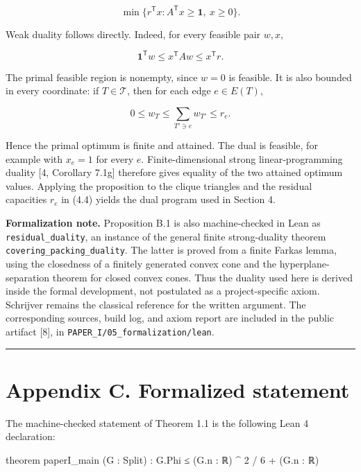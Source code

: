 \documentclass[
  11pt,
]{article}
\newenvironment{Shaded}{}{}
\newcommand{\NormalTok}[1]{#1}
\begin{document}
\[
\min\{r^{\mathsf T}x:A^{\mathsf T}x\ge\mathbf 1,\ x\ge0\}.
\]

Weak duality follows directly. Indeed, for every feasible pair \(w,x\),

\[
\mathbf 1^{\mathsf T}w
\le
x^{\mathsf T}Aw
\le
x^{\mathsf T}r.
\]

The primal feasible region is nonempty, since \(w=0\) is feasible. It is
also bounded in every coordinate: if \(T\in\mathcal T\), then for each
edge \(e\in E(T)\),

\[
0\le w_T\le\sum_{T'\ni e}w_{T'}\le r_e.
\]

Hence the primal optimum is finite and attained. The dual is feasible,
for example with \(x_e=1\) for every \(e\). Finite-dimensional strong
linear-programming duality {[}4, Corollary 7.1g{]} therefore gives
equality of the two attained optimum values. Applying the proposition to
the clique triangles and the residual capacities \(r_e\) in (4.4) yields
the dual program used in Section 4.

\textbf{Formalization note.} Proposition B.1 is also machine-checked in
Lean as \texttt{residual\_duality}, an instance of the general finite
strong-duality theorem \texttt{covering\_packing\_duality}. The latter
is proved from a finite Farkas lemma, using the closedness of a finitely
generated convex cone and the hyperplane-separation theorem for closed
convex cones. Thus the duality used here is derived inside the formal
development, not postulated as a project-specific axiom. Schrijver
remains the classical reference for the written argument. The
corresponding sources, build log, and axiom report are included in the
public artifact {[}8{]}, in \texttt{PAPER\_I/05\_formalization/lean}.

\begin{center}\rule{0.5\linewidth}{0.5pt}\end{center}

\section{Appendix C. Formalized
statement}\label{appendix-c.-formalized-statement}

The machine-checked statement of Theorem 1.1 is the following Lean 4
declaration:

\begin{Shaded}
\begin{Highlighting}[]
\NormalTok{theorem paperI\_main (G : Split) :}
\NormalTok{    G.Phi ≤ (G.n : ℝ) \^{} 2 / 6 + (G.n : ℝ)}
\end{Highlighting}
\end{Shaded}
\end{document}
